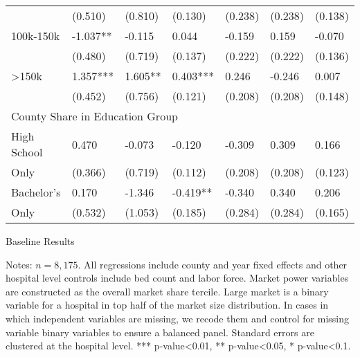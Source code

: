 \documentclass[12pt]{article}
\begin{document}
{\begin{tabular}{lllllll}
        	&	(0.510)	&	(0.810)	&	(0.130)	&	(0.238)	&	(0.238)	&	(0.138)	\\
\hspace{0.1in}100k-150k 	&	-1.037**	&	-0.115	&	0.044	&	-0.159	&	0.159	&	-0.070	\\
        	&	(0.480)	&	(0.719)	&	(0.137)	&	(0.222)	&	(0.222)	&	(0.136)	\\
\hspace{0.1in}>150k     	&	1.357***	&	1.605**	&	0.403***	&	0.246	&	-0.246	&	0.007	\\
        	&	(0.452)	&	(0.756)	&	(0.121)	&	(0.208)	&	(0.208)	&	(0.148)	\\
        \multicolumn{7}{l}{County Share in Education Group}\\	
\hspace{0.1in} High School      	&	0.470	&	-0.073	&	-0.120	&	-0.309	&	0.309	&	0.166	\\
\hspace{0.15in}  Only 	&	(0.366)	&	(0.719)	&	(0.112)	&	(0.208)	&	(0.208)&	(0.123)	\\
\hspace{0.1in}  Bachelor's      	&	0.170	&	-1.346	&	-0.419**	&	-0.340	&	0.340	&	0.206	\\
\hspace{0.15in}  Only            	&	(0.532)	&	(1.053)	&	(0.185)	&	(0.284)	&	(0.284)	&	(0.165)	\\
\hline
\end{tabular}
}
\setlength{\captionmargin}{.5 \textwidth} \addtolength{\captionmargin}{-.5\wd\gfxbox}
\begin{table}[!h]
\centering
\caption{Baseline Results}
\label{tab:baselineresults}
\usebox{\gfxbox}
\par
\begin{minipage}{\wd\gfxbox}
\footnotesize
Notes: $n=8,175$.  All regressions include county and year fixed effects and other hospital level controls include bed count and labor force.  Market power variables are constructed as the overall market share tercile.  Large market is a binary variable for a hospital in top half of the market size distribution.  In cases in which independent variables are missing, we recode them and control for missing variable binary variables to ensure a balanced panel.  Standard errors are clustered at the hospital level.  *** p-value<0.01, ** p-value<0.05, * p-value<0.1.
\end{minipage}
\end{table}
\end{document}
